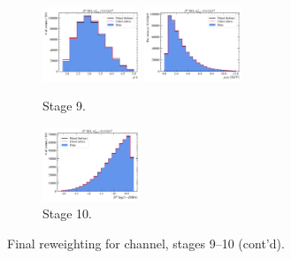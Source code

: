 \begin{figure}[htb]\ContinuedFloat
    \begin{subfigure}{\textwidth}
        \centering
        \includegraphics[width=0.32\textwidth]{./figs-mc-correction/reweighting-final/plot_step9-D0_iso-mu_eta.pdf}
        \includegraphics[width=0.32\textwidth]{./figs-mc-correction/reweighting-final/plot_step9-D0_iso-mu_pt.pdf}
        \caption{Stage 9.}
    \end{subfigure}

    \begin{subfigure}{\textwidth}
        \centering
        \includegraphics[width=0.32\textwidth]{./figs-mc-correction/reweighting-final/plot_step10-D0_iso-d0_comp2.pdf}
        \caption{Stage 10.}
    \end{subfigure}

    \caption[]{Final reweighting for \Dz channel, stages 9--10 (cont'd).}
\end{figure}


